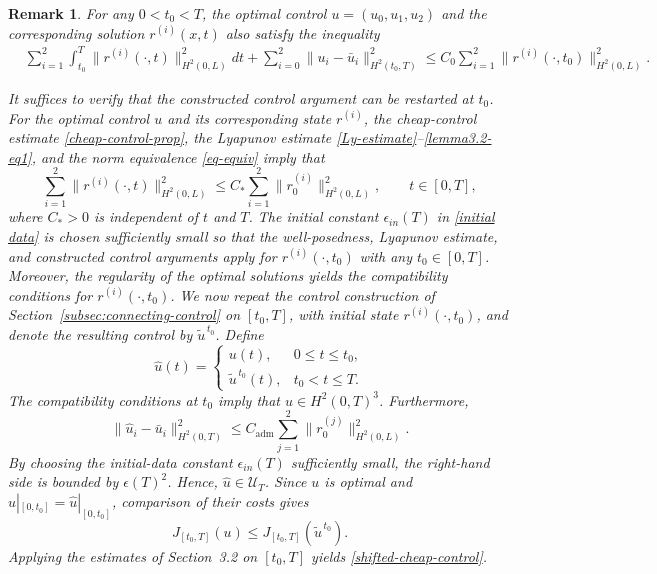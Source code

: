 \documentclass[12pt]{article}
\newtheorem{remark}{Remark}[section]
\numberwithin{equation}{section}
\begin{document}
\begin{remark}\label{remark32}
For any $0<t_0<T$, the optimal control $u=(u_0,u_1,u_2)$ and the corresponding solution $r^{(i)}(x,t)$ also satisfy the inequality 
    \begin{align}\label{shifted-cheap-control}
        &\sum_{i=1}^2\int_{t_0}^T \|r^{(i)}(\cdot,t) \|^2_{H^2(0,L)} dt + \sum_{i=0}^2 \|u_i-\bar{u}_i\|_{H^2(t_0,T)}^2
        \leq C_0 \sum_{i=1}^2 \|r^{(i)}(\cdot,t_0)\|^2_{H^2(0,L)}. 
    \end{align}

It suffices to verify that the constructed control argument can be
restarted at \(t_0\). For the optimal control \(u\) and its
corresponding state \(r^{(i)}\), the cheap-control estimate
\eqref{cheap-control-prop}, the Lyapunov estimate
\eqref{Ly-estimate}--\eqref{lemma3.2-eq1}, and the norm equivalence
\eqref{eq-equiv} imply that
\[
\sum_{i=1}^{2}
\|r^{(i)}(\cdot,t)\|_{H^2(0,L)}^2
\leq
C_*
\sum_{i=1}^{2}
\|r_0^{(i)}\|_{H^2(0,L)}^2,
\qquad t\in[0,T],
\]
where \(C_*>0\) is independent of \(t\) and \(T\).
The initial constant $\epsilon_{in}(T)$ in \eqref{initial data} is chosen sufficiently small 
so that the
well-posedness, Lyapunov estimate, and  constructed control arguments apply for \(r^{(i)}(\cdot,t_0)\) with any $t_0\in[0,T]$.
Moreover, the regularity of the optimal solutions yields the compatibility conditions for \(r^{(i)}(\cdot,t_0)\). 
We now repeat the control construction of
Section~\ref{subsec:connecting-control} on \([t_0,T]\), with initial state
\(r^{(i)}(\cdot,t_0)\), and denote the resulting control by
\(\widetilde u^{\,t_0}\). Define
\[
\widehat u(t)=
\begin{cases}
u(t),&0\leq t\leq t_0,\\
\widetilde u^{\,t_0}(t),&t_0<t\leq T.
\end{cases}
\]
The compatibility conditions at \(t_0\) imply that
\(\widehat u\in H^2(0,T)^3\). Furthermore,
\[
\|\widehat u_i-\bar u_i\|_{H^2(0,T)}^2
\leq
C_{\mathrm{adm}}
\sum_{j=1}^2
\|r_0^{(j)}\|_{H^2(0,L)}^2.
\]
By choosing the initial-data constant $\epsilon_{in}(T)$ sufficiently small, the right-hand side is bounded by
\(\epsilon(T)^2\). Hence, \(\widehat u\in \mathcal U_T\). Since \(u\) is optimal and \(u|_{[0,t_0]}=\widehat u|_{[0,t_0]}\), comparison of their costs gives
\[
J_{[t_0,T]}(u)\leq
J_{[t_0,T]}(\widetilde u^{\,t_0}).
\]
Applying the estimates of Section~3.2 on \([t_0,T]\) yields
\eqref{shifted-cheap-control}.




\end{remark}
\end{document}
